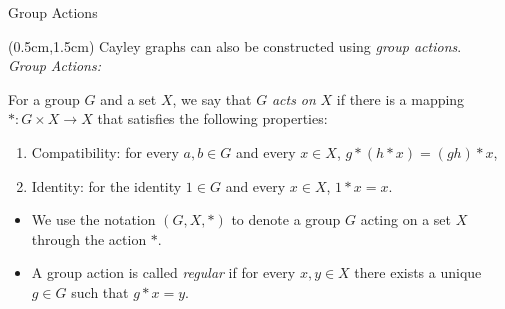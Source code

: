 \documentclass{beamer}
\theoremstyle{definition}
\begin{document}
\begin{frame}{Group Actions}
    
    \begin{textblock*}{12cm}(0.5cm,1.5cm)
        Cayley graphs can also be constructed using \textit{group actions}.\\
        \vspace{0.5cm}
        \textit{Group Actions:}
        \vspace{0.5cm}
                
        For a group $G$ and a set $X$, we say that $G$ \textit{acts on} $X$ if there is a mapping $*: G \times X \to X$ that satisfies the following properties:
        \begin{enumerate}
            \item Compatibility: for every $a, b \in G$ and every $x \in X$, $g * (h * x) = (gh) * x$,
            \item Identity: for the identity $1 \in G$ and every $x \in X$, $1 * x = x$. 
        \end{enumerate}

        \vspace{0.5 cm}
        \begin{itemize}
            \item  We use the notation $(G, X, *)$ to denote a group $G$ acting on a set $X$ through the action $*$.
            \item  A group action is called \textit{regular} if for every $x, y \in X$ there exists a unique $g \in G$ such that $g * x = y$.
        \end{itemize}


    \end{textblock*}

\end{frame}
\end{document}
